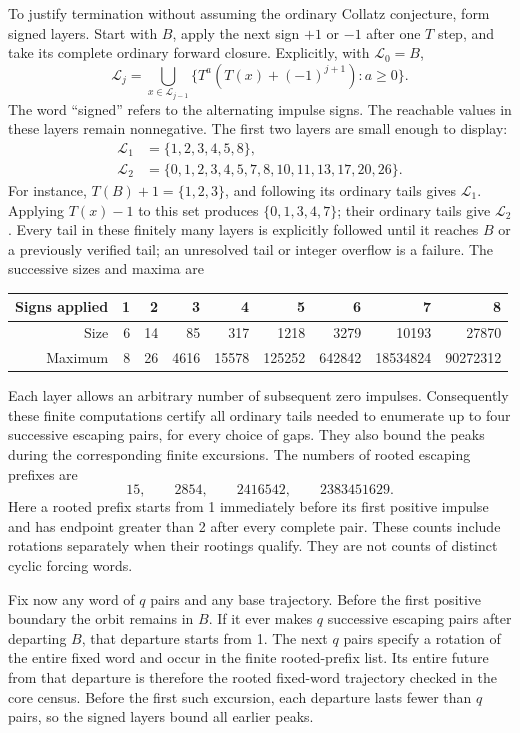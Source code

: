 To justify termination without assuming the ordinary Collatz conjecture,
form signed layers. Start with $B$, apply the next sign $+1$ or $-1$
after one $T$ step, and take its complete ordinary forward closure.
Explicitly, with $\mathcal L_0=B$,
\begin{equation}\label{eq:signed-layer-recurrence}
 \mathcal L_j=
 \bigcup_{x\in\mathcal L_{j-1}}
 \{T^a(T(x)+(-1)^{j+1}):a\ge0\}.
\end{equation}
The word ``signed'' refers to the alternating impulse signs. The
reachable values in these layers remain nonnegative. The first two
layers are small enough to display:
\begin{align*}
 \mathcal L_1&=\{1,2,3,4,5,8\},\\
 \mathcal L_2&=\{0,1,2,3,4,5,7,8,10,11,13,17,20,26\}.
\end{align*}
For instance, $T(B)+1=\{1,2,3\}$, and following its ordinary
tails gives $\mathcal L_1$. Applying $T(x)-1$ to this set produces
$\{0,1,3,4,7\}$; their ordinary tails give $\mathcal L_2$.
Every tail in these finitely many layers is explicitly followed until
it reaches $B$ or a previously verified tail; an unresolved tail or
integer overflow is a failure. The successive sizes and maxima are
\begin{center}\small
\begin{tabular}{rrrrrrrrr}\toprule
Signs applied&1&2&3&4&5&6&7&8\\\midrule
Size&6&14&85&317&1218&3279&10193&27870\\
Maximum&8&26&4616&15578&125252&642842&18534824&90272312\\\bottomrule
\end{tabular}
\end{center}
Each layer allows an arbitrary number of subsequent zero impulses.
Consequently these finite computations certify all ordinary tails
needed to enumerate up to four successive escaping pairs, for every
choice of gaps. They also bound the peaks during the corresponding
finite excursions. The numbers of rooted escaping prefixes are
\[
 15,\qquad 2854,\qquad 2416542,\qquad 2383451629.
\]
Here a rooted prefix starts from 1 immediately before its first positive
impulse and has endpoint greater than 2 after every complete pair.
These counts include rotations separately when their rootings qualify.
They are not counts of distinct cyclic forcing words.

Fix now any word of $q$ pairs and any base trajectory. Before the first
positive boundary the orbit remains in $B$. If it ever makes $q$
successive escaping pairs after departing $B$, that departure starts
from 1. The next $q$ pairs specify a rotation of the entire fixed word
and occur in the finite rooted-prefix list. Its entire future from
that departure is therefore the rooted fixed-word trajectory checked
in the core census. Before the first such excursion, each
departure lasts fewer than $q$ pairs, so the signed layers bound all
earlier peaks.

